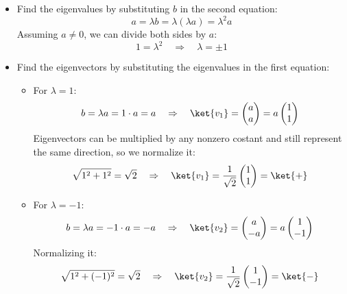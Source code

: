 \begin{itemize}
\begin{equation*}
    \end{equation*}
    \item Find the eigenvalues by substituting $b$ in the second equation:
    \begin{equation*}
        a = \lambda b = \lambda (\lambda a) = \lambda^2 a
    \end{equation*}
    Assuming $a \neq 0$, we can divide both sides by $a$:
    \begin{equation*}
        1 = \lambda^2 \quad \Rightarrow \quad \lambda = \pm 1
    \end{equation*}
    \item Find the eigenvectors by substituting the eigenvalues in the first equation:
    \begin{itemize}
        \item For $\lambda = 1$:
        \begin{equation*}
            b = \lambda a = 1 \cdot a = a \quad \Rightarrow \quad \ket{v_1} = \begin{pmatrix}
                a \\ a
            \end{pmatrix} = a\begin{pmatrix}
                1 \\ 1
            \end{pmatrix}
        \end{equation*}
        Eigenvectors can be multiplied by any nonzero costant and still represent the same direction, so we normalize it:
        \begin{equation*}
            \sqrt{1^2 + 1^2} = \sqrt{2} \quad \Rightarrow \quad \ket{v_1} = \frac{1}{\sqrt{2}}\begin{pmatrix}
                1 \\ 1
            \end{pmatrix} = \ket{+}
        \end{equation*}
        \item For $\lambda = -1$:
        \begin{equation*}
            b = \lambda a = -1 \cdot a = -a \quad \Rightarrow \quad \ket{v_2} = \begin{pmatrix}
                a \\ -a
            \end{pmatrix} = a\begin{pmatrix}
                1 \\ -1
            \end{pmatrix}
        \end{equation*}
        Normalizing it:
        \begin{equation*}
            \sqrt{1^2 + (-1)^2} = \sqrt{2} \quad \Rightarrow \quad \ket{v_2} = \frac{1}{\sqrt{2}}\begin{pmatrix}
                1 \\ -1
            \end{pmatrix} = \ket{-}
        \end{equation*}
    \end{itemize}
\end{itemize}
